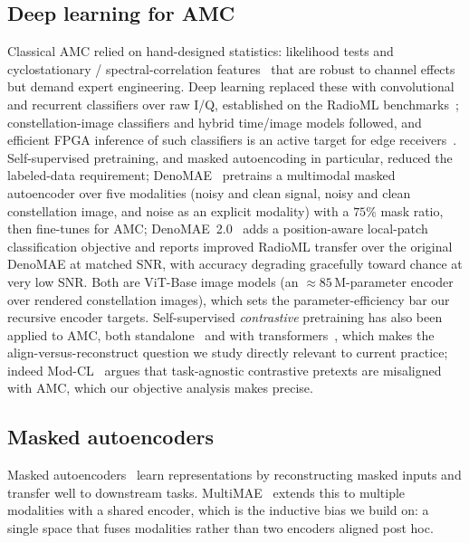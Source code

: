 \documentclass[conference]{IEEEtran}
\begin{document}
\subsection{Deep learning for AMC}
Classical AMC relied on hand-designed statistics: likelihood tests and
cyclostationary / spectral-correlation features~\cite{gardner,dobre} that are robust
to channel effects but demand expert engineering. Deep learning replaced these with
convolutional and recurrent classifiers over raw I/Q, established on the RadioML
benchmarks~\cite{oshea2016,oshea2018}; constellation-image classifiers and hybrid
time/image models followed, and efficient FPGA inference of such classifiers is an
active target for edge receivers~\cite{finn}. Self-supervised pretraining, and masked
autoencoding in particular, reduced the labeled-data requirement; DenoMAE~\cite{denomae} pretrains a
multimodal masked autoencoder over five modalities (noisy and clean signal, noisy
and clean constellation image, and noise as an explicit modality) with a $75\%$ mask
ratio, then fine-tunes for AMC; DenoMAE~2.0~\cite{denomae2} adds a position-aware
local-patch classification objective and reports improved RadioML transfer over the
original DenoMAE at matched SNR, with accuracy degrading gracefully toward chance at
very low SNR. Both are ViT-Base image models (an $\approx 85$\,M-parameter encoder
over rendered constellation images), which sets the parameter-efficiency bar our
recursive encoder targets.
Self-supervised \emph{contrastive} pretraining has also been applied to AMC, both
standalone~\cite{selfcontrastamc} and with transformers~\cite{kong}, which makes the
align-versus-reconstruct question we study directly relevant to current practice;
indeed Mod-CL~\cite{modcl} argues that task-agnostic contrastive pretexts are
misaligned with AMC, which our objective analysis makes precise.

\subsection{Masked autoencoders}
Masked autoencoders~\cite{mae} learn representations by reconstructing masked
inputs and transfer well to downstream tasks. MultiMAE~\cite{multimae} extends
this to multiple modalities with a shared encoder, which is the inductive bias we
build on: a single space that fuses modalities rather than two encoders aligned
post hoc.
\end{document}
